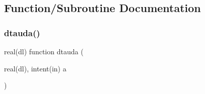 \subsection{Function/\+Subroutine Documentation}
\mbox{\label{equations__bde__v3_8f90_a1c228811398a4401bb57d778911a13df}} 
\subsubsection{\texorpdfstring{dtauda()}{dtauda()}}
{\footnotesize\ttfamily real(dl) function dtauda (\begin{DoxyParamCaption}\item[{real(dl), intent(in)}]{a }\end{DoxyParamCaption})}



